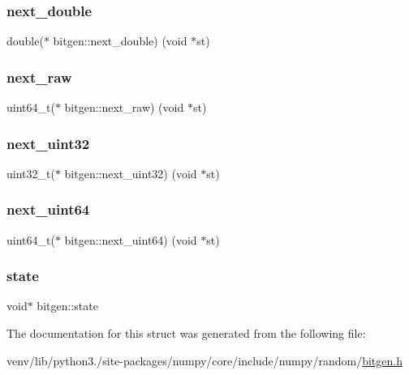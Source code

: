 \subsubsection{\texorpdfstring{next\+\_\+double}{next\_double}}
{\footnotesize\ttfamily double($\ast$ bitgen\+::next\+\_\+double) (void $\ast$st)}

\mbox{\label{structbitgen_a914703c2ebdf930e7ec895adfcefe460}} 
\subsubsection{\texorpdfstring{next\+\_\+raw}{next\_raw}}
{\footnotesize\ttfamily uint64\+\_\+t($\ast$ bitgen\+::next\+\_\+raw) (void $\ast$st)}

\mbox{\label{structbitgen_af36bd7d57b917544f091262d84d70187}} 
\subsubsection{\texorpdfstring{next\+\_\+uint32}{next\_uint32}}
{\footnotesize\ttfamily uint32\+\_\+t($\ast$ bitgen\+::next\+\_\+uint32) (void $\ast$st)}

\mbox{\label{structbitgen_ac98b5b4679fb88dec14c97d71d15148c}} 
\subsubsection{\texorpdfstring{next\+\_\+uint64}{next\_uint64}}
{\footnotesize\ttfamily uint64\+\_\+t($\ast$ bitgen\+::next\+\_\+uint64) (void $\ast$st)}

\mbox{\label{structbitgen_ab733f37992eaa4df15d6bbffe866921e}} 
\subsubsection{\texorpdfstring{state}{state}}
{\footnotesize\ttfamily void$\ast$ bitgen\+::state}



The documentation for this struct was generated from the following file\+:\begin{DoxyCompactItemize}
\item 
venv/lib/python3./site-\/packages/numpy/core/include/numpy/random/\hyperlink{bitgen_8h}{bitgen.\+h}\end{DoxyCompactItemize}
